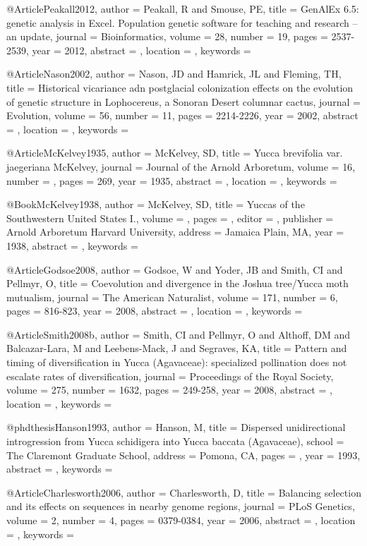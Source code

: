 @Article{Peakall2012,
author = {Peakall, R and Smouse, PE}, 
title = {GenAlEx 6.5: genetic analysis in Excel. Population genetic software for teaching and research -- an update}, 
journal = {Bioinformatics}, 
volume = {28}, 
number = {19}, 
pages = {2537-2539}, 
year = {2012}, 
abstract = {}, 
location = {}, 
keywords = {}}


@Article{Nason2002,
author = {Nason, JD and Hamrick, JL and Fleming, TH}, 
title = {Historical vicariance adn postglacial colonization effects on the evolution of genetic structure in Lophocereus, a Sonoran Desert columnar cactus}, 
journal = {Evolution}, 
volume = {56}, 
number = {11}, 
pages = {2214-2226}, 
year = {2002}, 
abstract = {}, 
location = {}, 
keywords = {}}


@Article{McKelvey1935,
author = {McKelvey, SD}, 
title = {Yucca brevifolia var. jaegeriana McKelvey}, 
journal = {Journal of the Arnold Arboretum}, 
volume = {16}, 
number = {}, 
pages = {269}, 
year = {1935}, 
abstract = {}, 
location = {}, 
keywords = {}}


@Book{McKelvey1938,
author = {McKelvey, SD}, 
title = {Yuccas of the Southwestern United States I.}, 
volume = {}, 
pages = {}, 
editor = {}, 
publisher = {Arnold Arboretum Harvard University}, 
address = {Jamaica Plain, MA}, 
year = {1938}, 
abstract = {}, 
keywords = {}}

@Article{Godsoe2008,
author = {Godsoe, W and Yoder, JB and Smith, CI and Pellmyr, O}, 
title = {Coevolution and divergence in the Joshua tree/Yucca moth mutualism}, 
journal = {The American Naturalist}, 
volume = {171}, 
number = {6}, 
pages = {816-823}, 
year = {2008}, 
abstract = {}, 
location = {}, 
keywords = {}}


@Article{Smith2008b,
author = {Smith, CI and Pellmyr, O and Althoff, DM and Balcazar-Lara, M and Leebens-Mack, J and Segraves, KA}, 
title = {Pattern and timing of diversification in Yucca (Agavaceae): specialized pollination does not escalate rates of diversification}, 
journal = {Proceedings of the Royal Society}, 
volume = {275}, 
number = {1632}, 
pages = {249-258}, 
year = {2008}, 
abstract = {}, 
location = {}, 
keywords = {}}


@phdthesis{Hanson1993,
author = {Hanson, M}, 
title = {Dispersed unidirectional introgression from Yucca schidigera into Yucca baccata (Agavaceae)}, 
school = {The Claremont Graduate School}, 
address = {Pomona, CA}, 
pages = {}, 
year = {1993}, 
abstract = {}, 
keywords = {}}

@Article{Charlesworth2006,
author = {Charlesworth, D}, 
title = {Balancing selection and its effects on sequences in nearby genome regions}, 
journal = {PLoS Genetics}, 
volume = {2}, 
number = {4}, 
pages = {0379-0384}, 
year = {2006}, 
abstract = {}, 
location = {}, 
keywords = {}}


